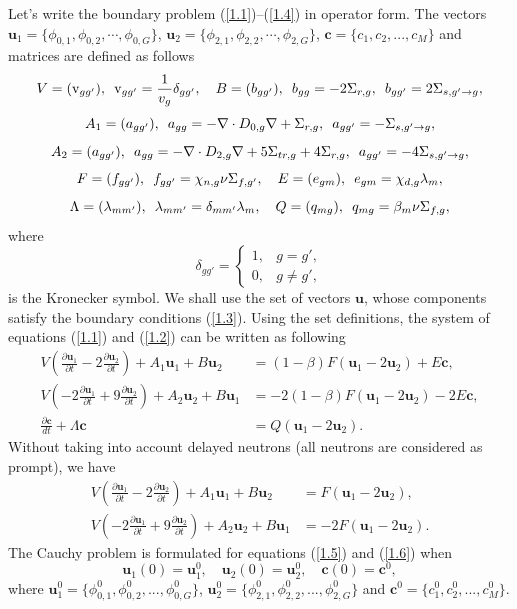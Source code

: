 \documentclass[authoryear]{elsarticle}
\begin{document}
Let's write the boundary problem (\ref{1.1})--(\ref{1.4}) in operator form. 
The vectors $\bm u_1 = \{\phi_{0,1}, \phi_{0,2}, \cdots, \phi_{0,G}\}$, $\bm u_2 = \{\phi_{2,1}, \phi_{2,2}, \cdots, \phi_{2,G}\}$, $\bm c = \{c_1, c_2, ..., c_M\}$ and matrices are defined as follows
\[
V = (\mathrm{v}_{gg'}),
\enskip
\mathrm{v}_{gg'} = \frac{1}{v_g} \delta_{gg'},
\quad
B = (b_{gg'}),
\enskip
b_{gg} = -2\Sigma_{r,g},
\enskip
b_{gg'} = 2\Sigma_{s, g' \rightarrow g},
\]
\[
A_1 = (a_{gg'}),
\enskip
a_{gg} = -\nabla \cdot D_{0,g} \nabla + \Sigma_{r,g},
\enskip
a_{gg'} = -\Sigma_{s, g' \rightarrow g},
\]
\[
A_2 = (a_{gg'}),
\enskip
a_{gg} = -\nabla \cdot D_{2,g} \nabla + 5\Sigma_{tr,g} + 4\Sigma_{r,g},
\enskip
a_{gg'} = -4\Sigma_{s, g' \rightarrow g},
\]
\[
F = (f_{gg'}),
\enskip
f_{gg'} = \chi_{n,g}\nu\Sigma_{f,g'},
\quad
E =(e_{gm}),
\enskip
e_{gm} = \chi_{d,g}\lambda_m,
\]
\[
\Lambda = (\lambda_{mm'}), 
\enskip
\lambda_{mm'} = \delta_{mm'}\lambda_m,
\quad
Q = (q_{mg}),
\enskip
q_{mg} =\beta_m \nu\Sigma_{f,g},
\]
where
\[
 \delta_{g g'} = \left \{ 
 \begin{matrix}
 1, & g = g', \\
 0, & g \neq  g',
 \end{matrix}
 \right. 
\]  
is the Kronecker symbol.
We shall use the set of vectors $\bm u$, whose components satisfy the boundary conditions (\ref{1.3}). 
Using the set definitions, the system of equations (\ref{1.1}) and (\ref{1.2}) can be written as following
\begin{equation}\label{1.5}
\begin{split}
V (\frac{\partial \bm u_1}{\partial t} - 2 \frac{\partial \bm u_2}{\partial t}) + A_1 \bm u_1 + B \bm u_2 &=(1-\beta) F (\bm u_1 - 2\bm u_2) + E\bm c,
\\
V(- 2 \frac{\partial \bm u_1}{\partial t} + 9 \frac{\partial \bm u_2}{\partial t} ) + A_2 \bm u_2 + B \bm u_1 &=-2(1-\beta) F (\bm u_1 - 2\bm u_2) - 2E\bm c,
\\
\frac{\partial \bm c}{d t} + \Lambda \bm c &= Q (\bm u_1 - 2\bm u_2). 
\end{split}
\end{equation}
Without taking into account delayed neutrons (all neutrons are considered as prompt), we have
\begin{equation}\label{1.6}
\begin{split}
V (\frac{\partial \bm u_1}{\partial t} - 2 \frac{\partial \bm u_2}{\partial t}) + A_1 \bm u_1 + B \bm u_2 &= F (\bm u_1 - 2\bm u_2),
\\
V( - 2 \frac{\partial \bm u_1}{\partial t} + 9 \frac{\partial \bm u_2}{\partial t}) + A_2 \bm u_2 + B \bm u_1 &=-2 F (\bm u_1 - 2\bm u_2).
\end{split}
\end{equation}
The Cauchy problem is formulated for equations (\ref{1.5}) and (\ref{1.6}) when
\begin{equation}\label{1.7}
 \bm u_1(0) = \bm u_1^0, \quad  \bm u_2(0) = \bm u_2^0, \quad \bm c(0) = \bm c^0,
\end{equation} 
where $\bm u_1^0 = \{\phi_{0,1}^0,  \phi_{0,2}^0, ...,  \phi_{0,G}^0 \}$, 
$\bm u_2^0 = \{\phi_{2,1}^0,  \phi_{2,2}^0, ...,  \phi_{2,G}^0 \}$ and 
$\bm c^0 = \{ c_1^0,  c_2^0, ...,  c_M^0 \}$.
\end{document}

